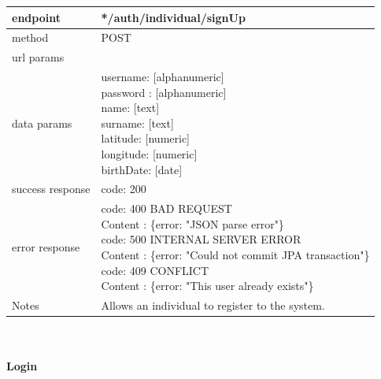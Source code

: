 \begin{legal}
\begin{legal}
\begin{itemize}
							\begin{tabularx}{\linewidth}{| l| l }
								\hline
								endpoint & */auth/individual/signUp \\
								\hline
								method & POST \\
								\hline
								url params & \\
								\hline
								data params &
								\parbox{0.7\textwidth}{
									\bigskip
									username: [alphanumeric]\\
									password : [alphanumeric]\\
									name: [text]\\
									surname: [text]\\
									latitude: [numeric]\\
									longitude: [numeric]\\
									birthDate: [date]
									\bigskip
								} \\
								\hline
								success response &
								\parbox{0.7\textwidth}{
									\bigskip
									code: 200\\
								} \\
								\hline
								error response &
								\parbox{0.7\textwidth}{
									\bigskip
									code: 400 BAD REQUEST \\
									Content : \{error: "JSON parse error"\}\\
									code: 500 INTERNAL SERVER ERROR \\
									Content : \{error: "Could not commit JPA transaction"\}\\
									code: 409 CONFLICT \\
									Content : \{error: "This user already exists"\}
									\bigskip
								} \\
								\hline
								Notes & 
								\parbox{0.7\textwidth}{
									\bigskip Allows an individual to register to the system.
								\bigskip}  \\
								\hline
							\end{tabularx}\\\\
					
							\textbf{Login}\\


\end{itemize}
\end{legal}
\end{legal}

